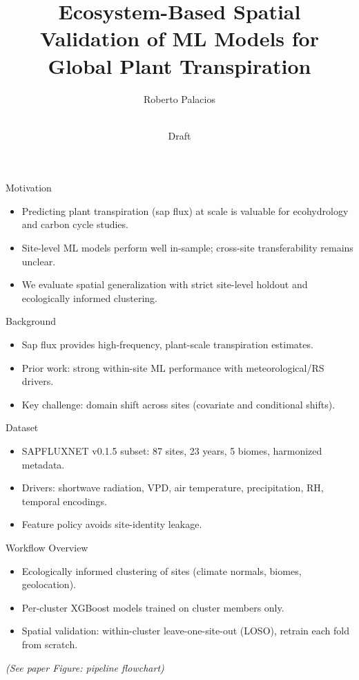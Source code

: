 \documentclass{beamer}
\title{Ecosystem-Based Spatial Validation of ML Models for Global Plant Transpiration}
\author{Roberto Palacios}
\date{\\Draft}
\begin{document}
\begin{frame}
  \titlepage
\end{frame}

\begin{frame}{Motivation}
  \begin{itemize}
    \item Predicting plant transpiration (sap flux) at scale is valuable for ecohydrology and carbon cycle studies.
    \item Site-level ML models perform well in-sample; cross-site transferability remains unclear.
    \item We evaluate spatial generalization with strict site-level holdout and ecologically informed clustering.
  \end{itemize}
\end{frame}

\begin{frame}{Background}
  \begin{itemize}
    \item Sap flux provides high-frequency, plant-scale transpiration estimates.
    \item Prior work: strong within-site ML performance with meteorological/RS drivers.
    \item Key challenge: domain shift across sites (covariate and conditional shifts).
  \end{itemize}
\end{frame}

\begin{frame}{Dataset}
  \begin{itemize}
    \item SAPFLUXNET v0.1.5 subset: 87 sites, 23 years, 5 biomes, harmonized metadata.
    \item Drivers: shortwave radiation, VPD, air temperature, precipitation, RH, temporal encodings.
    \item Feature policy avoids site-identity leakage.
  \end{itemize}
\end{frame}

\begin{frame}{Workflow Overview}
  \begin{itemize}
    \item Ecologically informed clustering of sites (climate normals, biomes, geolocation).
    \item Per-cluster XGBoost models trained on cluster members only.
    \item Spatial validation: within-cluster leave-one-site-out (LOSO), retrain each fold from scratch.
  \end{itemize}
  \vspace{0.5em}
  \centering
  \textit{(See paper Figure: pipeline flowchart)}
\end{frame}
\end{document}
